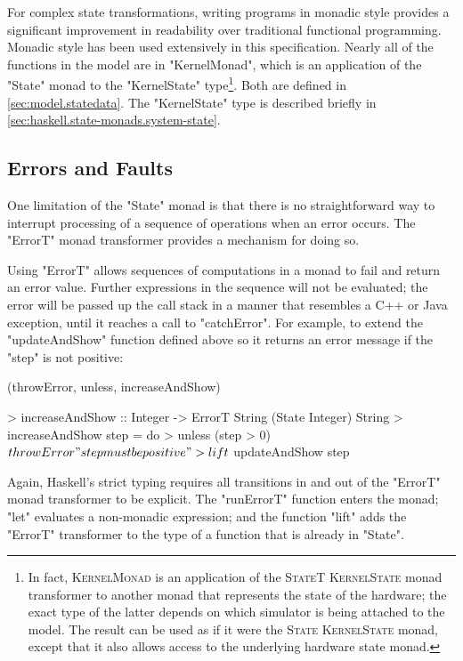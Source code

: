 For complex state transformations, writing programs in monadic style provides a significant improvement in readability over traditional functional programming. Monadic style has been used extensively in this specification. Nearly all of the functions in the model are in "KernelMonad", which is an application of the "State" monad to the "KernelState" type\footnote{In fact, {\hsfamily\scshape KernelMonad} is an application of the {\hsfamily\scshape StateT KernelState} monad transformer to another monad that represents the state of the hardware; the exact type of the latter depends on which simulator is being attached to the model. The result can be used as if it were the {\hsfamily\scshape State KernelState} monad, except that it also allows access to the underlying hardware state monad.}. Both are defined in \autoref{sec:model.statedata}. The "KernelState" type is described briefly in \autoref{sec:haskell.state-monads.system-state}.

\subsection{Errors and Faults}

One limitation of the "State" monad is that there is no straightforward way to interrupt processing of a sequence of operations when an error occurs. The "ErrorT" monad transformer provides a mechanism for doing so.

Using "ErrorT" allows sequences of computations in a monad to fail and return an error value. Further expressions in the sequence will not be evaluated; the error will be passed up the call stack in a manner that resembles a C++ or Java exception, until it reaches a call to "catchError". For example, to extend the "updateAndShow" function defined above so it returns an error message if the "step" is not positive:

\functions (throwError, unless, increaseAndShow)

> increaseAndShow :: Integer -> ErrorT String (State Integer) String
> increaseAndShow step = do
>         unless (step > 0) $ throwError "step must be positive"
>         lift $ updateAndShow step

Again, Haskell's strict typing requires all transitions in and out of the "ErrorT" monad transformer to be explicit. The "runErrorT" function enters the monad; "let" evaluates a non-monadic expression; and the function "lift" adds the "ErrorT" transformer to the type of a function that is already in "State".

